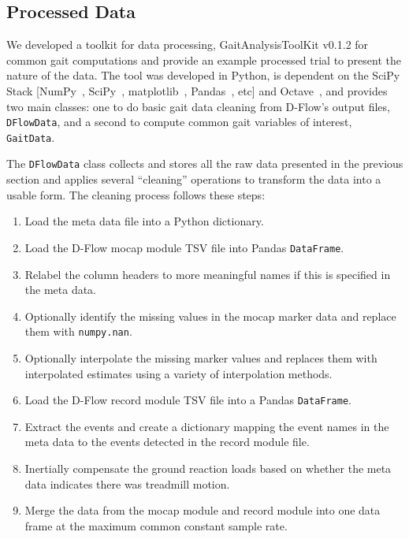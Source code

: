 \documentclass[fleqn,12pt]{wlpeerj}
\begin{document}
\subsection*{Processed Data}
%
We developed a toolkit for data processing, GaitAnalysisToolKit v0.1.2
\citep{Moore2014a} for common gait computations and provide an example
processed trial to present the nature of the data. The tool was developed in
Python, is dependent on the SciPy Stack [NumPy~\citep{Walt2011},
SciPy~\citep{Jones2001}, matplotlib~\citep{Hunter2007},
Pandas~\citep{McKinney2010}, etc] and Octave~\citep{Octave2014}, and provides
two main classes: one to do basic gait data cleaning from D-Flow's output
files, \verb|DFlowData|, and a second to compute common gait variables of
interest, \verb|GaitData|.

The \verb|DFlowData| class collects and stores all the raw data presented in
the previous section and applies several ``cleaning'' operations to transform
the data into a usable form. The cleaning process follows these steps:
%
\begin{enumerate}
  \item Load the meta data file into a Python dictionary.
  \item Load the D-Flow mocap module TSV file into Pandas \verb|DataFrame|.
  \item Relabel the column headers to more meaningful names if this is
    specified in the meta data.
  \item Optionally identify the missing values in the mocap marker data and
    replace them with \verb|numpy.nan|.
  \item Optionally interpolate the missing marker values and replaces them
    with interpolated estimates using a variety of interpolation methods.
  \item Load the D-Flow record module TSV file into a Pandas \verb|DataFrame|.
  \item Extract the events and create a dictionary mapping the event names in
    the meta data to the events detected in the record module file.
  \item Inertially compensate the ground reaction loads based on whether the
    meta data indicates there was treadmill motion.
  \item Merge the data from the mocap module and record module into one data
    frame at the maximum common constant sample rate.
\end{enumerate}
\end{document}
